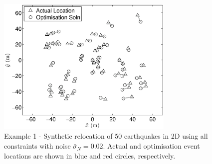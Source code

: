 \documentclass[draft,jgrga]{agutex}
\begin{document}



%
%
%
%
%
%

\clearpage
\begin{figure}
\noindent\includegraphics[width = 20pc]{diags/locs_2D_50eq_1.eps}
\caption{Example 1 - Synthetic relocation of 50 earthquakes in 2D using all constraints with noise $\bar{\sigma}_N=0.02$.
Actual and optimisation event locations
are shown in blue and red circles, respectively.}
\label{fig-2D50eq-relocation_eg1}
\end{figure}
\end{document}
